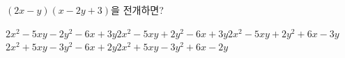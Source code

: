 $(2x-y)(x-2y+3)$을 전개하면?
\begin{choicesv}{$2x^2-5xy-2y^2-6x+3y$}{$2x^2-5xy+2y^2-6x+3y$}{$2x^2-5xy+2y^2+6x-3y$}{$2x^2+5xy-3y^2-6x+2y$}{$2x^2+5xy-3y^2+6x-2y$}\end{choicesv}
